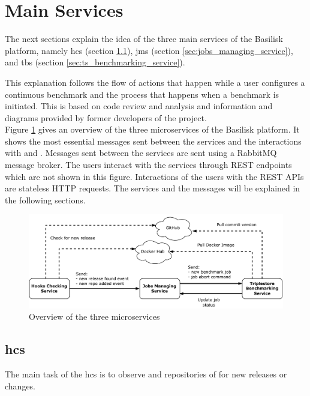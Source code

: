\section{Main Services}
\label{sec:main_services}
The next sections explain the idea of the three main services of the Basilisk platform, namely \acf{hcs} (section \ref{sec:hooks_checking_service}), \acf{jms} (section \ref{sec:jobs_managing_service}), and \acf{tbs} (section \ref{sec:ts_benchmarking_service}).

This explanation follows the flow of actions that happen while a user configures a continuous benchmark and the process that happens when a benchmark is initiated. This is based on code review and analysis and information and diagrams provided by former developers of the project.
\\

Figure \ref{fig:basilisk_high_level_design_approach} gives an overview of the three microservices of the Basilisk platform.
It shows the most essential messages sent between the services and the interactions with \gh{} and \dockh{}.
Messages sent between the services are sent using a RabbitMQ message broker.
The users interact with the services through REST endpoints which are not shown in this figure.
Interactions of the users with the REST APIs are stateless HTTP requests.
The services and the messages will be explained in the following sections.

\begin{figure}[tbph]
	\centering
	\includegraphics[width=1\textwidth]{figures/high-level-design-approach.pdf}
	\caption{Overview of the three microservices}
	\label{fig:basilisk_high_level_design_approach}
\end{figure}



\subsection{\acl{hcs}}
\label{sec:hooks_checking_service}
The main task of the \ac{hcs} is to observe \gh{} and \dockh{} repositories of \tsp{} for new releases or changes.

